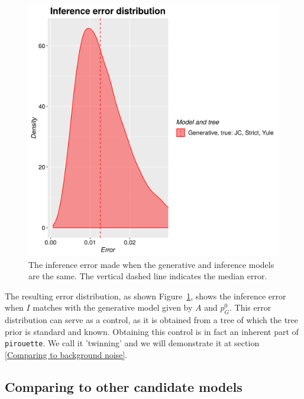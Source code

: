 \begin{figure}[H]
  \includegraphics[width=\textwidth]{example_1/errors.png}
  \caption{
    The inference error made 
    when the generative and inference models are the same.
    The vertical dashed line indicates the median error.
  }
  \label{fig:example_1}
\end{figure}

The resulting error distribution, as shown Figure~\ref{fig:example_1},
shows the inference error 
when $\mathit{I}$ matches with the generative model given 
by $\mathit{A}$ and $\mathit{p_{G}^0}$.
This error distribution can serve as a control,
as it is obtained from a tree of which the tree prior is standard and known.
Obtaining this control is in fact an inherent part of \verb;pirouette;. 
We call it 'twinning' and we will demonstrate it at section
 \ref{Comparing to background noise}.

\subsection{Comparing to other candidate models}

